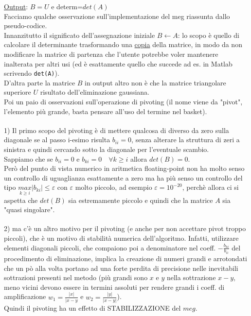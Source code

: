 \documentclass[12pt,a4paper]{article}
\begin{document}
\underline{Output}: $B=U$ e determ=$det(A)$\\
Facciamo qualche osservazione sull'implementazione del meg riassunta dallo pseudo-codice.\\
Innanzitutto il significato dell'assegnazione iniziale $B \leftarrow A$: lo scopo è quello di calcolare il determinante trasformando una \underline{copia} della matrice, in modo da non modificare la matrice di partenza che l'utente potrebbe voler mantenere inalterata per altri usi (ed è esattamente quello che succede ad es. in Matlab scrivendo \verb|det(A)|).\\
D'altra parte la matrice $B$ in output altro non è che la matrice triangolare superiore $U$ risultato dell'eliminazione gaussiana.\\
Poi un paio di osservazioni sull'operazione di pivoting (il nome viene da "pivot", l'elemento più grande, basta pensare all'uso del termine nel basket).\\\\
1) Il primo scopo del pivoting è di mettere qualcosa di diverso da zero sulla diagonale se al passo i-esimo risulta $b_{ii}=0$, senza alterare la struttura di zeri a sinistra e quindi cercando sotto la diagonale per l'eventuale scambio.\\Sappiamo che se $b_{ii}=0$ e $b_{ki}=0\quad \forall k\geq i$ allora $det(B)=0$.\\Però del punto di vista numerico in aritmetica floating-point non ha molto senso un controllo di uguaglianza esattamente a zero ma ha più senso un controllo del tipo $\underset{k\geq i}{max}|b_{ki}|\leq \varepsilon$ con $\varepsilon$ molto piccolo, ad esempio $\varepsilon=10^{-20}$, perchè allora ci si aspetta che $det(B)$ sia estremamente piccolo e quindi che la matrice $A$ sia "quasi singolare".\\\\2) ma c'è un altro motivo per il pivoting (e anche per non accettare pivot troppo piccoli), che è un motivo di stabilità numerica dell'algoritmo. Infatti, utilizzare elementi diagonali piccoli, che compaiono poi a denominatore nel coeff. $-\frac{b_{ki}}{b_{ii}}$ del procedimento di eliminazione, implica la creazione di numeri grandi e arrotondati che un pò alla volta portano ad una forte perdita di precisione nelle inevitabili sottrazioni presenti nel metodo (più grandi sono $x$ e $y$ nella sottrazione $x-y$, meno vicini devono essere in termini assoluti per rendere grandi i coeff. di amplificazione $w_1=\frac{|x|}{|x-y}$ e $w_2=\frac{|y|}{|x-y|}$).\\Quindi il pivoting ha un effetto di STABILIZZAZIONE del $meg$.\\\\
\end{document}
